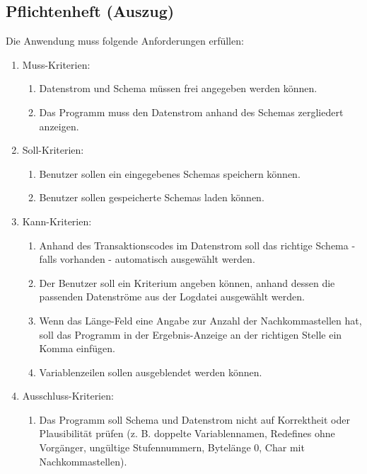 \subsection{Pflichtenheft (Auszug)}
\label{app:Pflichtenheft}
Die Anwendung muss folgende Anforderungen erfüllen: 
\begin{enumerate}[itemsep=0em,partopsep=0em,parsep=0em,topsep=0em]
\item Muss-Kriterien:
	\begin{enumerate}
	\item Datenstrom und Schema müssen frei angegeben werden können.
	\item Das Programm muss den Datenstrom anhand des Schemas zergliedert anzeigen.
	\end{enumerate}
\item Soll-Kriterien:
	\begin{enumerate}
	\item Benutzer sollen ein eingegebenes Schemas speichern können.
	\item Benutzer sollen gespeicherte Schemas laden können.
	\end{enumerate}
\item Kann-Kriterien:
	\begin{enumerate}
    \item Anhand des Transaktionscodes im Datenstrom soll das richtige Schema - falls vorhanden - automatisch ausgewählt werden.
    \item Der Benutzer soll ein Kriterium angeben können, anhand dessen die passenden Datenströme aus der Logdatei ausgewählt werden.
    \item Wenn das Länge-Feld eine Angabe zur Anzahl der Nachkommastellen hat, soll das Programm in der Ergebnis-Anzeige an der richtigen Stelle ein Komma einfügen.

    \item Variablenzeilen sollen ausgeblendet werden können.
        \end{enumerate}
\item Ausschluss-Kriterien:
	\begin{enumerate}
    \item Das Programm soll Schema und Datenstrom nicht auf Korrektheit oder Plausibilität prüfen
(z. B. doppelte Variablennamen, Redefines ohne Vorgänger, ungültige Stufennummern, Bytelänge 0, Char mit Nachkommastellen).
    \end{enumerate}
\end{enumerate}
